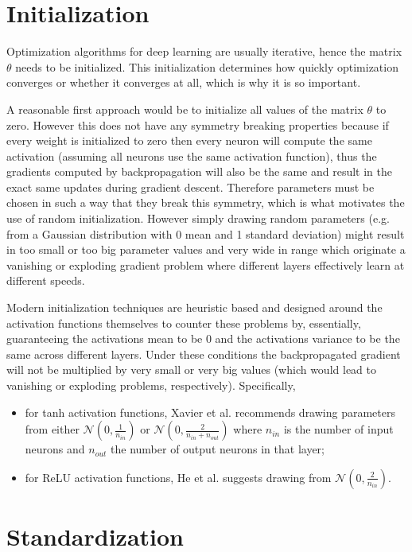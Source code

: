 \section{Initialization}

Optimization algorithms for deep learning are usually iterative, hence the matrix $\theta$ needs to be initialized. This initialization determines how quickly optimization converges or whether it converges at all, which is why it is so important.

A reasonable first approach would be to initialize all values of the matrix $\theta$ to zero. However this does not have any symmetry breaking properties because if every weight is initialized to zero then every neuron will compute the same activation (assuming all neurons use the same activation function), thus the gradients computed by backpropagation will also be the same and result in the exact same updates during gradient descent. Therefore parameters must be chosen in such a way that they break this symmetry, which is what motivates the use of random initialization. However simply drawing random parameters (e.g. from a Gaussian distribution with 0 mean and 1 standard deviation) might result in too small or too big parameter values and very wide in range which originate a vanishing or exploding gradient problem where different layers effectively learn at different speeds.

Modern initialization techniques are heuristic based and designed around the activation functions themselves to counter these problems by, essentially, guaranteeing the activations mean to be $0$ and the activations variance to be the same across different layers. Under these conditions the backpropagated gradient will not be multiplied by very small or very big values (which would lead to vanishing or exploding problems, respectively). Specifically,

\begin{itemize}
    \item for tanh activation functions, Xavier et al.\cite{xavierinit} recommends drawing parameters from either $\mathcal{N}(0, \frac{1}{n_{in}})$ or $\mathcal{N}(0, \frac{2}{n_{in}+n_{out}})$ where $n_{in}$ is the number of input neurons and $n_{out}$ the number of output neurons in that layer;
    \item for ReLU activation functions, He et al.\cite{heinit} suggests drawing from $\mathcal{N}(0, \frac{2}{n_{in}})$.
\end{itemize}

\section{Standardization}

